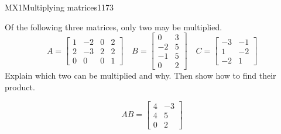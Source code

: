 \begin{exercise}{MX1}{Multiplying matrices}{1173} 
\begin{exerciseStatement} 

Of the following three matrices, only two may be multiplied. \[
          A=\left[\begin{array}{cccc}
1 & -2 & 0 & 2 \\
2 & -3 & 2 & 2 \\
0 & 0 & 0 & 1
\end{array}\right] \hspace{1em} B=\left[\begin{array}{cc}
0 & 3 \\
-2 & 5 \\
-1 & 5 \\
0 & 2
\end{array}\right] \hspace{1em} C=\left[\begin{array}{cc}
-3 & -1 \\
1 & -2 \\
-2 & 1
\end{array}\right]
      \] Explain which two can be multiplied and why. Then show how to find their product.

 \end{exerciseStatement}
 \begin{exerciseAnswer} \[AB=\left[\begin{array}{cc}
4 & -3 \\
4 & 5 \\
0 & 2
\end{array}\right]\] \end{exerciseAnswer}
 \end{exercise}



